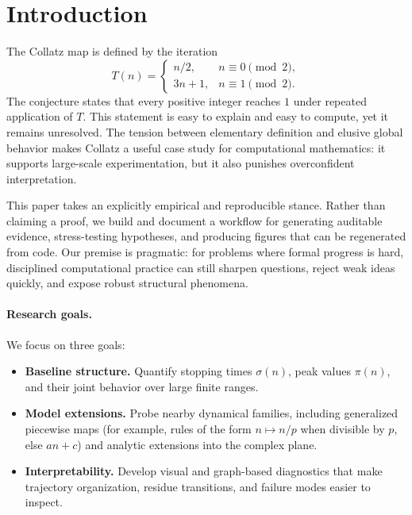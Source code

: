 \section{Introduction}

The Collatz map is defined by the iteration
\[
T(n)=
\begin{cases}
n/2, & n \equiv 0 \pmod 2,\\
3n+1, & n \equiv 1 \pmod 2.
\end{cases}
\]
The conjecture states that every positive integer reaches $1$ under repeated application of $T$.
This statement is easy to explain and easy to compute, yet it remains unresolved.
The tension between elementary definition and elusive global behavior makes Collatz a useful case study for computational mathematics: it supports large-scale experimentation, but it also punishes overconfident interpretation.

This paper takes an explicitly empirical and reproducible stance.
Rather than claiming a proof, we build and document a workflow for generating auditable evidence, stress-testing hypotheses, and producing figures that can be regenerated from code.
Our premise is pragmatic: for problems where formal progress is hard, disciplined computational practice can still sharpen questions, reject weak ideas quickly, and expose robust structural phenomena.

\paragraph{Research goals.}
We focus on three goals:
\begin{itemize}
  \item \textbf{Baseline structure.} Quantify stopping times $\sigma(n)$, peak values $\pi(n)$, and their joint behavior over large finite ranges.
  \item \textbf{Model extensions.} Probe nearby dynamical families, including generalized piecewise maps (for example, rules of the form $n \mapsto n/p$ when divisible by $p$, else $an+c$) and analytic extensions into the complex plane.
  \item \textbf{Interpretability.} Develop visual and graph-based diagnostics that make trajectory organization, residue transitions, and failure modes easier to inspect.
\end{itemize}

